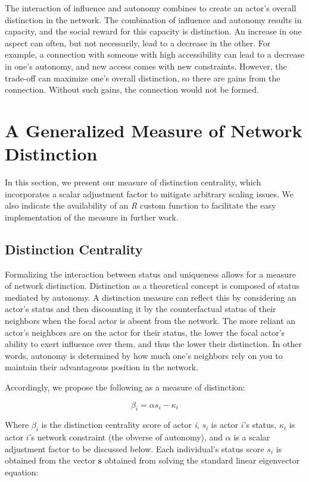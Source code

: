 \documentclass[12pt]{article}
\begin{document}
The interaction of influence and autonomy combines to create an actor’s overall distinction in the network. The combination of influence and autonomy results in capacity, and the social reward for this capacity is distinction. An increase in one aspect can often, but not necessarily, lead to a decrease in the other. For example, a connection with someone with high accessibility can lead to a decrease in one’s autonomy, and new access comes with new constraints. However, the trade-off can maximize one’s overall distinction, so there are gains from the connection. Without such gains, the connection would not be formed.

\section{A Generalized Measure of Network Distinction}
In this section, we present our measure of distinction centrality, which incorporates a scalar adjustment factor to mitigate arbitrary scaling issues. We also indicate the availability of an \textit{R} custom function to facilitate the easy implementation of the measure in further work.

\subsection{Distinction Centrality}

Formalizing the interaction between status and uniqueness allows for a measure of network distinction. Distinction as a theoretical concept is composed of status mediated by autonomy. A distinction measure can reflect this by considering an actor's status and then discounting it by the counterfactual status of their neighbors when the focal actor is absent from the network. The more reliant an actor's neighbors are on the actor for their status, the lower the focal actor's ability to exert influence over them, and thus the lower their distinction. In other words, autonomy is determined by how much one's neighbors rely on you to maintain their advantageous position in the network. 

Accordingly, we propose the following as a measure of distinction:

\begin{equation}
\beta_i= \alpha s_i - \kappa_i
\label{eq:distinction}
\end{equation}

Where $\beta_i$ is the distinction centrality score of actor \textit{i}, $s_i$ is actor $i$'s status, $\kappa_i$ is actor $i$'s network constraint (the obverse of autonomy), and $\alpha$ is a scalar adjustment factor to be discussed below. Each individual's status score $s_i$ is obtained from the vector $\mathbf{s}$ obtained from solving the standard linear eigenvector equation:
\end{document}
